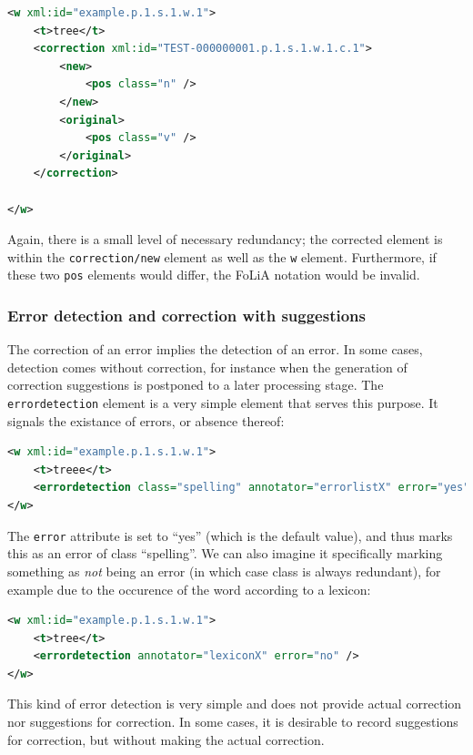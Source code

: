 \documentclass[a4paper,12pt]{report}
\begin{document}
\begin{lstlisting}[language=xml]
<w xml:id="example.p.1.s.1.w.1">
    <t>tree</t>
    <correction xml:id="TEST-000000001.p.1.s.1.w.1.c.1">
        <new>
            <pos class="n" />
        </new>
        <original>
            <pos class="v" />
        </original>
    </correction>
    
</w>    
\end{lstlisting}

Again, there is a small level of necessary redundancy; the corrected element is within the \texttt{correction/new} element as well as the \texttt{w} element. Furthermore, if these two \texttt{pos} elements would differ, the FoLiA notation would be invalid.

\subsubsection{Error detection and correction with suggestions} 

The correction of an error implies the detection of an error. In some cases, detection comes without correction, for instance when the generation of correction suggestions is postponed to a later processing stage. The \texttt{errordetection} element is a very simple element that serves this purpose. It signals the existance of errors, or absence thereof:

\begin{lstlisting}[language=xml]
<w xml:id="example.p.1.s.1.w.1">
    <t>treee</t>
    <errordetection class="spelling" annotator="errorlistX" error="yes" />
</w>    
\end{lstlisting}

The \texttt{error} attribute is set to ``yes'' (which is the default value), and thus marks this as an error of class ``spelling''. We can also imagine it specifically marking something as \emph{not} being an error (in which case class is always redundant), for example due to the occurence of the word according to a lexicon:

\begin{lstlisting}[language=xml]
<w xml:id="example.p.1.s.1.w.1">
    <t>tree</t>
    <errordetection annotator="lexiconX" error="no" />
</w>    
\end{lstlisting}

This kind of error detection is very simple and does not provide actual correction nor suggestions for correction. In some cases, it is desirable to record suggestions for correction, but without making the actual correction.
\end{document}
